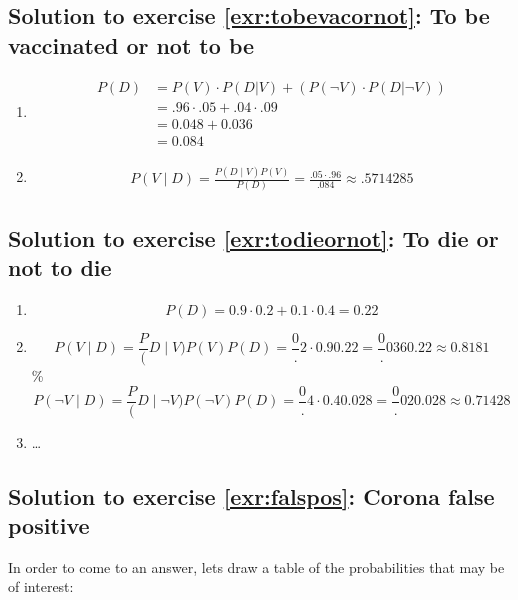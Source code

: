 \documentclass[
  12pt,
  oneside]{book}
\providecommand{\tightlist}{%
  \setlength{\itemsep}{0pt}\setlength{\parskip}{0pt}}
\theoremstyle{definition}
\theoremstyle{definition}
\theoremstyle{definition}
\theoremstyle{definition}
\theoremstyle{remark}
\begin{document}
\hypertarget{sol:tobevacornot}{%
\subsection*{Solution to exercise \ref{exr:tobevacornot}: To be vaccinated or not to be}\label{sol:tobevacornot}}

\begin{enumerate}
\def\labelenumi{\alph{enumi})}
\tightlist
\item
  \begin{align*}
            P(D)&=P(V)\cdot P(D|V)+(P(\neg V)\cdot P(D|\neg V))\\
            &= .96\cdot .05 + .04 \cdot .09\\
            &= 0.048 + 0.036 \\&= 0.084
  \end{align*}
\item
  \begin{align*}
  P(V \mid D)={\frac {P(D\mid V)P(V)}{P(D)}}= \frac{.05\cdot .96}{.084}\approx .5714285
  \end{align*}
\end{enumerate}

\hypertarget{sol:todieornot}{%
\subsection*{Solution to exercise \ref{exr:todieornot}: To die or not to die}\label{sol:todieornot}}

\begin{enumerate}
\def\labelenumi{\alph{enumi})}
\tightlist
\item
  \[P(D) = 0.9\cdot0.2+0.1\cdot0.4=0.22\]
\item
  \[P(V\mid D)=\frac P(D\mid V)P(V)P(D)=\frac0.2\cdot 0.90.22=\frac0.0360.22\approx0.8181\]
  \% \[P(\neg V\mid D)=\frac P(D\mid \neg V)P(\neg V)P(D)=\frac0.4\cdot 0.40.028=\frac0.020.028\approx0.71428\]
\item
  \ldots{}
\end{enumerate}

\hypertarget{sol:falspos}{%
\subsection*{Solution to exercise \ref{exr:falspos}: Corona false positive}\label{sol:falspos}}

In order to come to an answer, lets draw a table of the probabilities that may be of interest:
\end{document}
